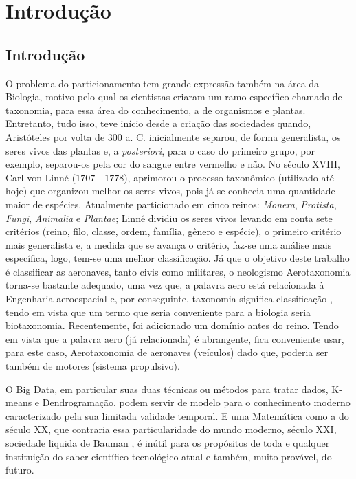 \documentclass[12pt]{article} %
\begin{document}
	
	\newpage
	\pagestyle{fancy}
	\thispagestyle{empty}
	
	\chapter{Introdução}
	
		\section{Introdução}
			
			O problema do particionamento tem grande expressão também na área da Biologia, motivo pelo qual os cientistas criaram um ramo específico chamado de taxonomia, para essa área do conhecimento, a de organismos e plantas. Entretanto, tudo isso, teve início desde a criação das sociedades quando, Aristóteles por volta de $ 300 $ a. C. inicialmente separou, de forma generalista, os seres vivos das plantas e, a \textit{posteriori}, para o caso do primeiro grupo, por exemplo, separou-os pela cor do sangue entre vermelho e não. No século XVIII, Carl von Linné ($ 1707 $ - $ 1778 $), aprimorou o processo taxonômico (utilizado até hoje) que organizou melhor os seres vivos, pois já se conhecia uma quantidade maior de espécies. Atualmente  particionado em cinco reinos: \textit{Monera}, \textit{Protista}, \textit{Fungi}, \textit{Animalia} e \textit{Plantae}; Linné dividiu os seres vivos levando em conta sete critérios (reino, filo, classe, ordem, família, gênero e espécie), o primeiro critério mais generalista e, a medida que se avança o critério, faz-se uma análise mais específica, logo, tem-se uma melhor classificação. Já que o objetivo deste trabalho é classificar as aeronaves, tanto civis como militares, o neologismo Aerotaxonomia torna-se bastante adequado, uma vez que, a palavra aero está relacionada à Engenharia aeroespacial e, por conseguinte, taxonomia significa classificação \cite{Linnaeus1758}, tendo em vista que um termo que seria conveniente para a biologia seria biotaxonomia. Recentemente, foi adicionado um domínio antes do reino. Tendo em vista que a palavra aero (já relacionada) é abrangente, fica conveniente usar, para este caso, Aerotaxonomia de aeronaves (veículos) dado que, poderia ser também de motores (sistema propulsivo). 
			
			O Big Data, em particular suas duas técnicas ou métodos para  tratar dados, K-means e Dendrogramação, podem servir de modelo para o conhecimento moderno caracterizado pela sua limitada validade temporal. E uma Matemática como a do século XX, que contraria essa particularidade do mundo moderno, século XXI, sociedade liquida de Bauman \cite{Bauman2000}, é inútil para os propósitos de toda e qualquer instituição do saber científico-tecnológico atual e também, muito provável, do futuro.
			
\end{document}
